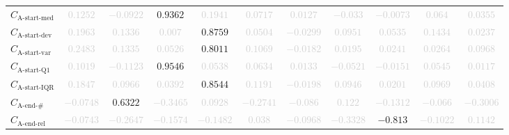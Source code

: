 \documentclass{standalone}
\newcommand{\startmedianname}{\text{A-start-med}}
\newcommand{\startmedian}{C_{\startmedianname}}
\newcommand{\startdevname}{\text{A-start-dev}}
\newcommand{\startdev}{C_{\startdevname}}
\newcommand{\startvarname}{\text{A-start-var}}
\newcommand{\startvar}{C_{\startvarname}}
\newcommand{\startqonename}{\text{A-start-Q1}}
\newcommand{\startqone}{C_{\startqonename}}
\newcommand{\startiqrname}{\text{A-start-IQR}}
\newcommand{\startiqr}{C_{\startiqrname}}
\newcommand{\lastactivitiesname}{\text{A-end-\#}}
\newcommand{\lastactivities}{C_{\lastactivitiesname}}
\newcommand{\lastactivitiesrelname}{\text{A-end-rel}}
\newcommand{\lastactivitiesrel}{C_{\lastactivitiesrelname}}
\begin{document}
\begin{tabular}{lcccccccccc}
$\startmedian$ & \textcolor{lightgray}{$0.1252$} & \textcolor{lightgray}{$-0.0922$} & $0.9362$ & \textcolor{lightgray}{$0.1941$} & \textcolor{lightgray}{$0.0717$} & \textcolor{lightgray}{$0.0127$} & \textcolor{lightgray}{$-0.033$} & \textcolor{lightgray}{$-0.0073$} & \textcolor{lightgray}{$0.064$} & \textcolor{lightgray}{$0.0355$} \\ 
$\startdev$ & \textcolor{lightgray}{$0.1963$} & \textcolor{lightgray}{$0.1336$} & \textcolor{lightgray}{$0.007$} & $0.8759$ & \textcolor{lightgray}{$0.0504$} & \textcolor{lightgray}{$-0.0299$} & \textcolor{lightgray}{$0.0951$} & \textcolor{lightgray}{$0.0535$} & \textcolor{lightgray}{$0.1434$} & \textcolor{lightgray}{$0.0237$} \\ 
$\startvar$ & \textcolor{lightgray}{$0.2483$} & \textcolor{lightgray}{$0.1335$} & \textcolor{lightgray}{$0.0526$} & $0.8011$ & \textcolor{lightgray}{$0.1069$} & \textcolor{lightgray}{$-0.0182$} & \textcolor{lightgray}{$0.0195$} & \textcolor{lightgray}{$0.0241$} & \textcolor{lightgray}{$0.0264$} & \textcolor{lightgray}{$0.0968$} \\ 
$\startqone$ & \textcolor{lightgray}{$0.1019$} & \textcolor{lightgray}{$-0.1123$} & $0.9546$ & \textcolor{lightgray}{$0.0538$} & \textcolor{lightgray}{$0.0634$} & \textcolor{lightgray}{$0.0133$} & \textcolor{lightgray}{$-0.0521$} & \textcolor{lightgray}{$-0.0151$} & \textcolor{lightgray}{$0.0545$} & \textcolor{lightgray}{$0.0117$} \\ 
$\startiqr$ & \textcolor{lightgray}{$0.1847$} & \textcolor{lightgray}{$0.0966$} & \textcolor{lightgray}{$0.0392$} & $0.8544$ & \textcolor{lightgray}{$0.1191$} & \textcolor{lightgray}{$-0.0198$} & \textcolor{lightgray}{$0.0946$} & \textcolor{lightgray}{$0.0201$} & \textcolor{lightgray}{$0.0969$} & \textcolor{lightgray}{$0.0408$} \\ 
$\lastactivities$ & \textcolor{lightgray}{$-0.0748$} & $0.6322$ & \textcolor{lightgray}{$-0.3465$} & \textcolor{lightgray}{$0.0928$} & \textcolor{lightgray}{$-0.2741$} & \textcolor{lightgray}{$-0.086$} & \textcolor{lightgray}{$0.122$} & \textcolor{lightgray}{$-0.1312$} & \textcolor{lightgray}{$-0.066$} & \textcolor{lightgray}{$-0.3006$} \\ 
$\lastactivitiesrel$ & \textcolor{lightgray}{$-0.0743$} & \textcolor{lightgray}{$-0.2647$} & \textcolor{lightgray}{$-0.1574$} & \textcolor{lightgray}{$-0.1482$} & \textcolor{lightgray}{$0.038$} & \textcolor{lightgray}{$-0.0968$} & \textcolor{lightgray}{$-0.3328$} & $-0.813$ & \textcolor{lightgray}{$-0.1022$} & \textcolor{lightgray}{$0.1142$} \\ 

\end{tabular}
\end{document}
